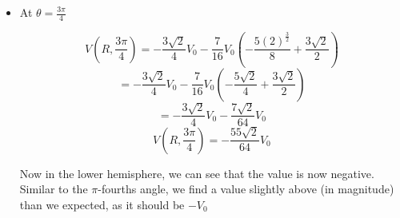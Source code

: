\begin{enumerate}
\begin{enumerate}
\begin{itemize}
          \item At $\theta=\frac{3\pi}{4}$

            $$V\left( R,\frac{3\pi}{4} \right)=-\frac{3\sqrt{2}}{4}V_0-\frac{7}{16}V_0\left( -\frac{5(2)^{\frac{3}{2}}}{8}+\frac{3\sqrt{2}}{2} \right)$$
            $$=-\frac{3\sqrt{2}}{4}V_0-\frac{7}{16}V_0\left( -\frac{5\sqrt{2}}{4}+\frac{3\sqrt{2}}{2} \right)$$
            $$=-\frac{3\sqrt{2}}{4}V_0-\frac{7\sqrt{2}}{64}V_0$$
            $$\boxed{V\left( R,\frac{3\pi}{4} \right)=-\frac{55\sqrt{2}}{64}V_0}$$

            Now in the lower hemisphere, we can see that the value is now negative. Similar to the $\pi$-fourths angle, we find a value slightly above (in magnitude) than we expected, as it should be $-V_0$

        \end{itemize}

    \end{enumerate}

\end{enumerate}



